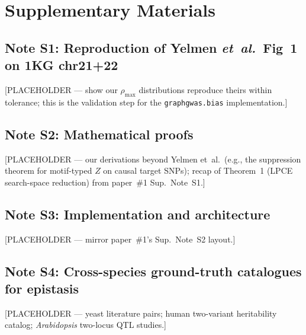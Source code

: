 
\section*{Supplementary Materials}

\subsection*{Note S1: Reproduction of Yelmen \emph{et~al.}\ Fig~1 on 1KG chr21+22}\label{sup:fig1_reprod}

[PLACEHOLDER --- show our $\rho_{\max}$ distributions reproduce theirs
within tolerance; this is the validation step for the
\texttt{graphgwas.bias} implementation.]

\subsection*{Note S2: Mathematical proofs}\label{sup:proofs}

[PLACEHOLDER --- our derivations beyond Yelmen et~al.\ (e.g., the
suppression theorem for motif-typed $Z$ on causal target SNPs);
recap of Theorem~1 (LPCE search-space reduction) from
paper~\#1 \cite{estaji2026graphgwas} Sup.\ Note~S1.]

\subsection*{Note S3: Implementation and architecture}\label{sup:impl}

[PLACEHOLDER --- mirror paper~\#1's Sup.\ Note~S2 layout.]

\subsection*{Note S4: Cross-species ground-truth catalogues for epistasis}\label{sup:catalogues}

[PLACEHOLDER --- yeast literature pairs; human two-variant
heritability catalog; \emph{Arabidopsis} two-locus QTL studies.]
